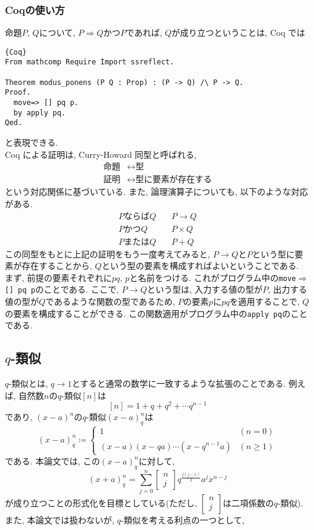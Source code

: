 \documentclass[11pt]{jarticle}
\theoremstyle{mystyle}
\newcommand{\qcoe}[2]{\left[\begin{array}{ccc}#1\\#2\end{array}\right]}
\newcommand{\Lra}{\Longrightarrow}
\newcommand{\ra}{\rightarrow}
\newcommand{\0}{\textbf{0}}
\newcommand{\1}{\textbf{1}}
\newcommand{\2}{\textbf{2}}
\begin{document}
\subsubsection{Coqの使い方}
命題$P$, $Q$について, $P \Lra Q$かつ$P$であれば, $Q$が成り立つということは, Coq では
\begin{lstlisting}{Coq}
From mathcomp Require Import ssreflect.

Theorem modus_ponens (P Q : Prop) : (P -> Q) /\ P -> Q.
Proof.
  move=> [] pq p.
  by apply pq.
Qed.
\end{lstlisting}
と表現できる. \\
Coq による証明は, Curry-Howard 同型と呼ばれる, 
\begin{align*}
  \text{命題} &\leftrightarrow \text{型} \\
  \text{証明} &\leftrightarrow \text{型に要素が存在する}
\end{align*}
という対応関係に基づいている. また, 論理演算子についても, 以下のような対応がある. 
\begin{align*}
  P \text{ならば} Q &\quad P \rightarrow Q \\
  P \text{かつ} Q &\quad P \times Q \\
  P \text{または} Q &\quad  P + Q
\end{align*}
この同型をもとに上記の証明をもう一度考えてみると, $P \ra Q$と$P$という型に要素が存在することから, $Q$という型の要素を構成すればよいということである. \\
まず, 前提の要素それぞれに$pq$, $p$と名前をつける. これがプログラム中の{\tt move$\Rightarrow$ [] pq p}のことである. 
ここで, $P \to Q$という型は, 入力する値の型が$P$, 出力する値の型が$Q$であるような関数の型であるため, $P$の要素$p$に$pq$を適用することで, $Q$の要素を構成することができる. この関数適用がプログラム中の{\tt apply pq}のことである. 
\subsection{$q$-類似}
$q$-類似とは, $q \to 1$とすると通常の数学に一致するような拡張のことである. 例えば, 自然数$n$の$q$-類似$[n]$は
\[
  [n] = 1 + q + q^2 + \cdots q ^ {n -1} 
\]
であり, $(x-a)^n$の$q$-類似$(x-a)^n_q$は
\[
  (x-a)^n_q \coloneqq \begin{cases}
                                  1 & (n=0)\\
                                  (x-a)(x-qa)\cdots(x-q^{n-1}a) & (n\ge1)
                                \end{cases}
\]
である. 本論文では, この$(x - a)^n_q$に対して, 
\[
  (x+a)^n_q = \sum_{j=0}^n \qcoe{n}{j} q^{\frac{j(j-1)}{2}} a^j x^{n-j}
\]
が成り立つことの形式化を目標としている(ただし, $\qcoe{n}{j}$は二項係数の$q$-類似). また, 本論文では扱わないが, $q$-類似を考える利点の一つとして, 
\end{document}
